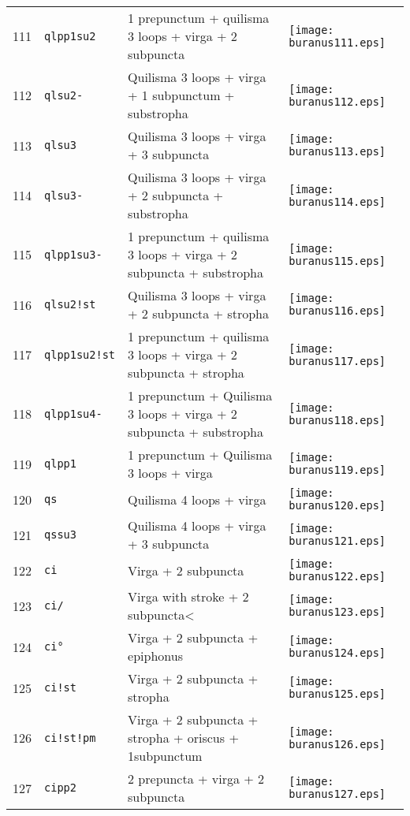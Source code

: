 \documentclass{scrarticle}
\begin{document}
\begin{longtable}{l|l|l|l}
111 & \texttt{qlpp1su2} & 1 prepunctum + quilisma 3 loops + virga + 2 subpuncta & \texttt{[image: buranus111.eps]} \\
112 & \texttt{qlsu2-} & Quilisma 3 loops + virga + 1 subpunctum + substropha & \texttt{[image: buranus112.eps]} \\
113 & \texttt{qlsu3} & Quilisma 3 loops + virga + 3 subpuncta & \texttt{[image: buranus113.eps]} \\
114 & \texttt{qlsu3-} & Quilisma 3 loops + virga + 2 subpuncta + substropha & \texttt{[image: buranus114.eps]} \\
115 & \texttt{qlpp1su3-} & 1 prepunctum + quilisma 3 loops + virga + 2 subpuncta + substropha & \texttt{[image: buranus115.eps]} \\
116 & \texttt{qlsu2!st} & Quilisma 3 loops + virga + 2 subpuncta + stropha & \texttt{[image: buranus116.eps]} \\
117 & \texttt{qlpp1su2!st} & 1 prepunctum + quilisma 3 loops + virga + 2 subpuncta + stropha & \texttt{[image: buranus117.eps]} \\
118 & \texttt{qlpp1su4-} & 1 prepunctum + Quilisma 3 loops + virga + 2 subpuncta + substropha & \texttt{[image: buranus118.eps]} \\
119 & \texttt{qlpp1} & 1 prepunctum + Quilisma 3 loops + virga & \texttt{[image: buranus119.eps]} \\
120 & \texttt{qs} & Quilisma 4 loops + virga & \texttt{[image: buranus120.eps]} \\
121 & \texttt{qssu3} & Quilisma 4 loops + virga + 3 subpuncta & \texttt{[image: buranus121.eps]} \\
122 & \texttt{ci} & Virga + 2 subpuncta & \texttt{[image: buranus122.eps]} \\
123 & \texttt{ci/} & Virga with stroke + 2 subpuncta< & \texttt{[image: buranus123.eps]} \\
124 & \texttt{ci°} & Virga + 2 subpuncta + epiphonus & \texttt{[image: buranus124.eps]} \\
125 & \texttt{ci!st} & Virga + 2 subpuncta + stropha & \texttt{[image: buranus125.eps]} \\
126 & \texttt{ci!st!pm} & Virga + 2 subpuncta + stropha + oriscus + 1subpunctum & \texttt{[image: buranus126.eps]} \\
127 & \texttt{cipp2} & 2 prepuncta + virga + 2 subpuncta & \texttt{[image: buranus127.eps]} \\

\end{longtable}
\end{document}
